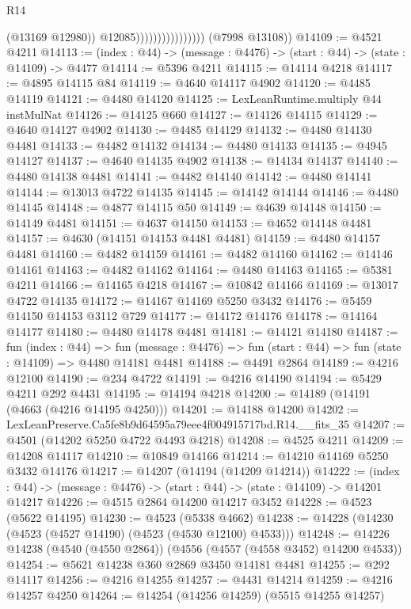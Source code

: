 \begin{lexlean}{R14}
\begin{coremodule}
                                        (@13169 @12980))
                                      @12085))))))))))))))))
      (@7998 @13108))
@14109 := @4521 @4211
@14113 := (index : @44) -> (message : @4476) -> (start : @44) -> (state : @14109) -> @4477
@14114 := @5396 @4211
@14115 := @14114 @4218
@14117 := @4895 @14115 @84
@14119 := @4640 @14117 @4902
@14120 := @4485 @14119
@14121 := @4480 @14120
@14125 := LexLeanRuntime.multiply @44 instMulNat
@14126 := @14125 @660
@14127 := @14126 @14115
@14129 := @4640 @14127 @4902
@14130 := @4485 @14129
@14132 := @4480 @14130 @4481
@14133 := @4482 @14132
@14134 := @4480 @14133
@14135 := @4945 @14127
@14137 := @4640 @14135 @4902
@14138 := @14134 @14137
@14140 := @4480 @14138 @4481
@14141 := @4482 @14140
@14142 := @4480 @14141
@14144 := @13013 @4722 @14135
@14145 := @14142 @14144
@14146 := @4480 @14145
@14148 := @4877 @14115 @50
@14149 := @4639 @14148
@14150 := @14149 @4481
@14151 := @4637 @14150
@14153 := @4652 @14148 @4481
@14157 := @4630 (@14151 @14153 @4481 @4481)
@14159 := @4480 @14157 @4481
@14160 := @4482 @14159
@14161 := @4482 @14160
@14162 := @14146 @14161
@14163 := @4482 @14162
@14164 := @4480 @14163
@14165 := @5381 @4211
@14166 := @14165 @4218
@14167 := @10842 @14166
@14169 := @13017 @4722 @14135
@14172 := @14167 @14169 @5250 @3432
@14176 := @5459 @14150 @14153 @3112 @729
@14177 := @14172 @14176
@14178 := @14164 @14177
@14180 := @4480 @14178 @4481
@14181 := @14121 @14180
@14187 := fun (index : @44) =>
  fun (message : @4476) => fun (start : @44) => fun (state : @14109) => @4480 @14181 @4481
@14188 := @4491 @2864
@14189 := @4216 @12100
@14190 := @234 @4722
@14191 := @4216 @14190
@14194 := @5429 @4211 @292 @4431
@14195 := @14194 @4218
@14200 := @14189 (@14191 (@4663 (@4216 @14195 @4250)))
@14201 := @14188 @14200
@14202 := LexLeanPreserve.Ca5fe8b9d64595a79eee4f004915717bd.R14.__fits_35
@14207 := @4501 (@14202 @5250 @4722 @4493 @4218)
@14208 := @4525 @4211
@14209 := @14208 @14117
@14210 := @10849 @14166
@14214 := @14210 @14169 @5250 @3432 @14176
@14217 := @14207 (@14194 (@14209 @14214))
@14222 := (index : @44) -> (message : @4476) -> (start : @44) -> (state : @14109) -> @14201 @14217
@14226 := @4515 @2864 @14200 @14217 @3452
@14228 := @4523 (@5622 @14195)
@14230 := @4523 (@5338 @4662)
@14238 := @14228 (@14230 (@4523 (@4527 @14190) (@4523 (@4530 @12100) @4533)))
@14248 := @14226 @14238 (@4540 (@4550 @2864)) (@4556 (@4557 (@4558 @3452) @14200 @4533))
@14254 := @5621 @14238 @360 @2869 @3450 @14181 @4481
@14255 := @292 @14117
@14256 := @4216 @14255
@14257 := @4431 @14214
@14259 := @4216 @14257 @4250
@14264 := @14254 (@14256 @14259) (@5515 @14255 @14257)

\end{coremodule}
\end{lexlean}
